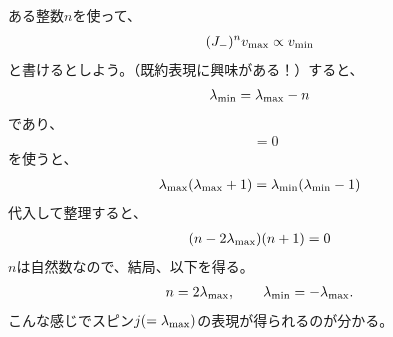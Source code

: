 \documentclass[10pt,a4paper]{jarticle}
\begin{document}
ある整数$n$を使って、
\begin{align}
(J_-)^n v_{\rm max} \propto v_{\rm min}
\end{align}
と書けるとしよう。（既約表現に興味がある！）すると、
\begin{align}
\lambda_{\rm min} = \lambda_{\rm max} - n
\end{align}
であり、
\begin{align}
[J_\pm, J_1^2 + J_2^2 + J_3^2] &= 0
\end{align}
を使うと、
\begin{align}
\lambda_{\rm max} (\lambda_{\rm max}+1)
=
\lambda_{\rm min} (\lambda_{\rm min}-1)
\end{align}
代入して整理すると、
\begin{align}
(n-2\lambda_{\rm max})(n+1) = 0
\end{align}
$n$は自然数なので、結局、以下を得る。
\begin{align}
n = 2\lambda_{\rm max}, \qquad
\lambda_{\rm min} = -\lambda_{\rm max}.
\end{align}
こんな感じでスピン$j(=\lambda_{\rm max})$の表現が得られるのが分かる。
\end{document}
